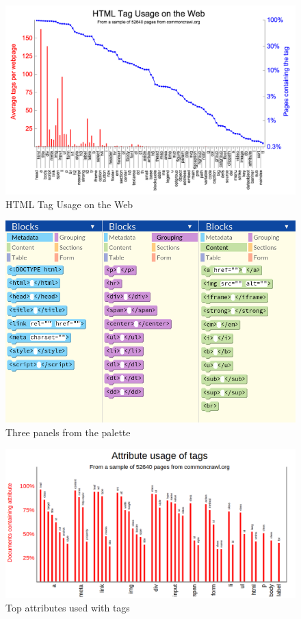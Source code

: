 \documentclass[conference]{IEEEtran}
\begin{document}
\begin{figure}
\centering
\includegraphics[width=\columnwidth]{taggraph3.png}
\caption{HTML Tag Usage on the Web}
\label{Tagsgraph}
\end{figure}

\begin{figure}
\centering
\includegraphics[width=0.7\columnwidth]{Palette.png}
\caption{Three panels from the palette}
\label{paletteimage}
\end{figure}

\begin{figure}
\centering
\includegraphics[width=\columnwidth]{attrgraph.png}
\caption{Top attributes used with tags}
\label{attrgraph}
\end{figure}
\end{document}
